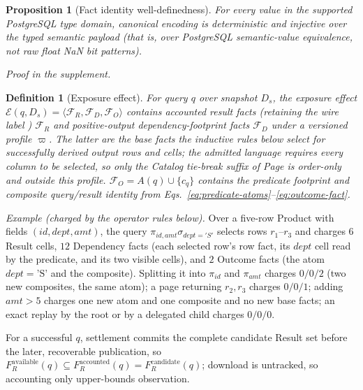 \documentclass[10pt,journal,compsoc]{IEEEtran}
\newcommand{\code}[1]{\texttt{\detokenize{#1}}}
\newcommand{\facts}{\mathcal{F}}
\newcommand{\effect}{\mathcal{E}}
\newtheorem{definition}{Definition}
\newtheorem{proposition}{Proposition}
\begin{document}
\begin{proposition}[Fact identity well-definedness]
\label{thm:fact-identity}
For every value in the supported PostgreSQL type domain, canonical encoding
is deterministic and injective over the typed semantic payload (that is, over
PostgreSQL semantic-value equivalence, not raw float NaN bit patterns).
\end{proposition}
\emph{Proof in the supplement.}

\begin{definition}[Exposure effect]
For query $q$ over snapshot $D_s$, the exposure effect
$\effect(q,D_s)=\langle \facts_R,\facts_D,\facts_O\rangle$ contains accounted
result facts (retaining the wire label \code{release})
$\facts_R$ and positive-output dependency-footprint facts $\facts_D$ under a
versioned profile $\varpi$.  The latter are the base facts the inductive rules
below select for successfully derived output rows and cells; the admitted language
requires every \code{ORDER BY} column to be selected, so only the Catalog
tie-break suffix of Page is order-only and outside this profile.
$\facts_O=A(q)\cup\{c_q\}$ contains the predicate footprint and composite
query/result identity from Eqs.~\eqref{eq:predicate-atoms}--\eqref{eq:outcome-fact}.
\end{definition}

\emph{Example (charged by the operator rules below).} Over a five-row Product with fields $(id,dept,amt)$, the
query $\pi_{id,amt}\sigma_{dept='S'}$ selects rows $r_1$--$r_3$ and charges
$6$ Result cells, $12$ Dependency facts (each selected row's row fact, its
$dept$ cell read by the predicate, and its two visible cells), and $2$
Outcome facts (the atom $dept{=}\text{'S'}$ and the composite). Splitting it
into $\pi_{id}$ and $\pi_{amt}$ charges $0/0/2$ (two new composites, the same
atom); a page returning $r_2,r_3$ charges $0/0/1$; adding $amt>5$ charges
one new atom and one composite and no new base facts; an exact replay by the
root or by a delegated child charges $0/0/0$.

For a successful $q$, settlement commits the complete candidate Result set
before the later, recoverable publication, so
$F_R^{\mathrm{available}}(q)\subseteq F_R^{\mathrm{accounted}}(q)
=F_R^{\mathrm{candidate}}(q)$; download is untracked, so accounting only
upper-bounds observation.
\end{document}
